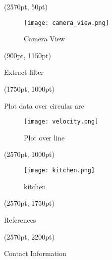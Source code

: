 \documentclass[final]{beamer}
\begin{document}
\begin{textblock*}{800pt}(2570pt, 50pt)
\begin{figure}
\texttt{[image: camera\_view.png]}
\caption{Camera View}
\end{figure}
\end{textblock*}

\begin{textblock*}{800pt}(900pt, 1150pt)
\begin{block}{Extract filter}
\end{block}
\end{textblock*}

\begin{textblock*}{800pt}(1750pt, 1000pt)
\begin{block}{Plot data over circular arc}
\begin{figure}
\texttt{[image: velocity.png]}
\caption{Plot over line}
\end{figure}
\end{block}
\end{textblock*}

\begin{textblock*}{800pt}(2570pt, 1000pt)
\begin{figure}
\texttt{[image: kitchen.png]}
\caption{kitchen}
\end{figure}
\end{textblock*}

\begin{textblock*}{800pt}(2570pt, 1750pt)
\begin{block}{References}
\end{block}
\end{textblock*}

\begin{textblock*}{800pt}(2570pt, 2200pt)
\begin{block}{Contact Information}
\end{block}
\end{textblock*}
\end{document}
